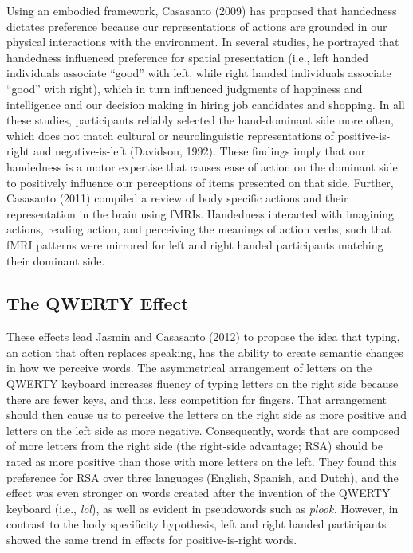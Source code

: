 \documentclass[
  english,
  man]{apa7}
\begin{document}
Using an embodied framework, Casasanto (2009) has proposed that handedness dictates preference because our representations of actions are grounded in our physical interactions with the environment. In several studies, he portrayed that handedness influenced preference for spatial presentation (i.e., left handed individuals associate ``good'' with left, while right handed individuals associate ``good'' with right), which in turn influenced judgments of happiness and intelligence and our decision making in hiring job candidates and shopping. In all these studies, participants reliably selected the hand-dominant side more often, which does not match cultural or neurolinguistic representations of positive-is-right and negative-is-left (Davidson, 1992). These findings imply that our handedness is a motor expertise that causes ease of action on the dominant side to positively influence our perceptions of items presented on that side. Further, Casasanto (2011) compiled a review of body specific actions and their representation in the brain using fMRIs. Handedness interacted with imagining actions, reading action, and perceiving the meanings of action verbs, such that fMRI patterns were mirrored for left and right handed participants matching their dominant side.

\hypertarget{the-qwerty-effect}{%
\subsection{The QWERTY Effect}\label{the-qwerty-effect}}

These effects lead Jasmin and Casasanto (2012) to propose the idea that typing, an action that often replaces speaking, has the ability to create semantic changes in how we perceive words. The asymmetrical arrangement of letters on the QWERTY keyboard increases fluency of typing letters on the right side because there are fewer keys, and thus, less competition for fingers. That arrangement should then cause us to perceive the letters on the right side as more positive and letters on the left side as more negative. Consequently, words that are composed of more letters from the right side (the right-side advantage; RSA) should be rated as more positive than those with more letters on the left. They found this preference for RSA over three languages (English, Spanish, and Dutch), and the effect was even stronger on words created after the invention of the QWERTY keyboard (i.e., \emph{lol}), as well as evident in pseudowords such as \emph{plook.} However, in contrast to the body specificity hypothesis, left and right handed participants showed the same trend in effects for positive-is-right words.
\end{document}
